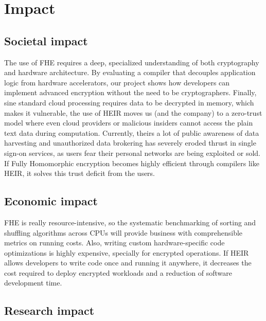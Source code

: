 \section{Impact}                                         %
\subsection{Societal impact}
The use of FHE requires a deep, specialized understanding of both cryptography and hardware architecture. By evaluating a compiler that decouples application logic from hardware accelerators, our project shows how developers can implement advanced encryption without the need to be cryptographers. Finally, sine standard cloud processing requires data to be decrypted in memory, which makes it vulnerable, the use of HEIR moves us (and the company) to a zero-trust model where even cloud providers or malicious insiders cannot access the plain text data during computation.
Currently, theirs a lot of public awareness of data harvesting and unauthorized data brokering has severely eroded thrust in single sign-on services, as users fear their personal networks are being exploited or sold. If Fully Homomorphic encryption becomes highly efficient through compilers like HEIR, it solves this trust deficit from the users. 

\subsection{Economic impact}
FHE is really resource-intensive, so the systematic benchmarking of sorting and shuffling algorithms across CPUs will provide business with comprehensible metrics on running costs. Also, writing custom hardware-specific code optimizations is highly expensive, specially for encrypted operations. If HEIR allows developers to write code once and running it anywhere, it  decreases the cost required to deploy encrypted workloads and a reduction of software development time. 





\subsection{Research impact}

